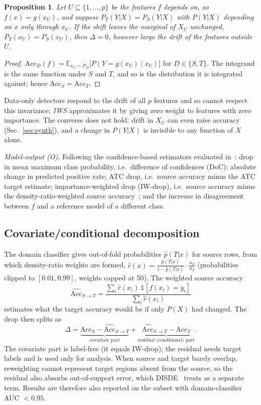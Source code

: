 \documentclass[conference]{IEEEtran}
\theoremstyle{plainhead}
\newtheorem{proposition}{Proposition}
\newcommand{\iws}{\textit{IWS}}
\begin{document}
\begin{proposition}
Let $U\subseteq\{1,\dots,p\}$ be the features $f$ depends on, so $f(x)=g(x_U)$, and suppose $P_T(Y|X)=P_S(Y|X)$ with $P(Y|X)$ depending on $x$ only through $x_U$. If the shift leaves the marginal of $X_U$ unchanged, $P_T(x_U)=P_S(x_U)$, then $\Delta=0$, however large the drift of the features outside $U$.
\end{proposition}
\begin{proof}
$\mathrm{Acc}_D(f)=\mathbb{E}_{x_U\sim P_D}\big[P(Y{=}g(x_U)\mid x_U)\big]$ for $D\in\{S,T\}$. The integrand is the same function under $S$ and $T$, and so is the distribution it is integrated against; hence $\mathrm{Acc}_S=\mathrm{Acc}_T$.
\end{proof}

Data-only detectors respond to the drift of all $p$ features and so cannot respect this invariance; \iws{} approximates it by giving zero weight to features with zero importance. The converse does not hold: drift in $X_U$ can even raise accuracy (Sec.~\ref{sec:synth}), and a change in $P(Y|X)$ is invisible to any function of $X$ alone.

\textit{Model-output (O).} Following the confidence-based estimators evaluated in~\cite{deng2023confidence,xie2024mano}: drop in mean maximum class probability, i.e.\ difference of confidences (DoC); absolute change in predicted positive rate; ATC drop, i.e.\ source accuracy minus the ATC target estimate; importance-weighted drop (IW-drop), i.e.\ source accuracy minus the density-ratio-weighted source accuracy~\cite{kato2023double}; and the increase in disagreement between $f$ and a reference model of a different class.

\subsection{Covariate/conditional decomposition}
\label{sec:decomp}
The domain classifier gives out-of-fold probabilities $\hat p(T|x)$ for source rows, from which density-ratio weights are formed, $\hat r(x)=\frac{\hat p(T|x)}{1-\hat p(T|x)}\cdot\frac{n_S}{n_T}$ (probabilities clipped to $[0.01,0.99]$, weights capped at 50). The weighted source accuracy
\begin{equation}
\widehat{\mathrm{Acc}}_{S\to T}=\frac{\sum_i \hat r(x_i)\,\mathbb{1}[f(x_i)=y_i]}{\sum_i \hat r(x_i)}
\end{equation}
estimates what the target accuracy would be if only $P(X)$ had changed. The drop then splits as
\begin{equation}
\Delta=\underbrace{\mathrm{Acc}_S-\widehat{\mathrm{Acc}}_{S\to T}}_{\text{covariate part}}
+\underbrace{\widehat{\mathrm{Acc}}_{S\to T}-\mathrm{Acc}_T}_{\text{residual (conditional) part}} .
\label{eq:decomp}
\end{equation}
The covariate part is label-free (it equals IW-drop); the residual needs target labels and is used only for analysis. When source and target barely overlap, reweighting cannot represent target regions absent from the source, so the residual also absorbs out-of-support error, which DISDE~\cite{cai2023diagnosing} treats as a separate term. Results are therefore also reported on the subset with domain-classifier AUC $<0.95$.
\end{document}
